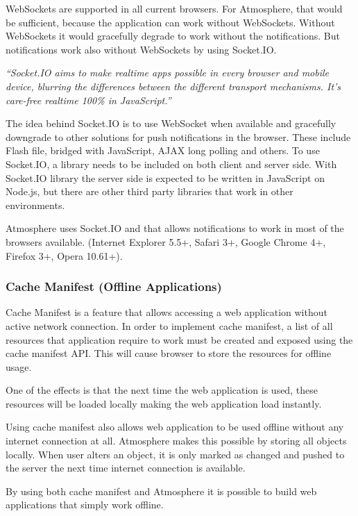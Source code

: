 WebSockets are supported in all current browsers. For Atmosphere, that would be sufficient, because the application can work without WebSockets. Without WebSockets it would gracefully degrade to work without the notifications. But notifications work also without WebSockets by using Socket.IO. \citep{socketio}

\emph{``Socket.IO aims to make realtime apps possible in every browser and mobile device, blurring the differences between the different transport mechanisms. It's care-free realtime 100\% in JavaScript.''} \citep{socketio}

The idea behind Socket.IO is to use WebSocket when available and gracefully downgrade to other solutions for push notifications in the browser. These include Flash file, bridged with JavaScript, AJAX long polling and others. To use Socket.IO, a library needs to be included on both client and server side. With Socket.IO library the server side is expected to be written in JavaScript on Node.js, but there are other third party libraries that work in other environments.

Atmosphere uses Socket.IO and that allows notifications to work in most of the browsers available. (Internet Explorer 5.5+, Safari 3+, Google Chrome 4+, Firefox 3+, Opera 10.61+).

\subsubsection{Cache Manifest (Offline Applications)}

Cache Manifest is a feature that allows accessing a web application without active network connection. In order to implement cache manifest, a list of all resources that application require to work must be created and exposed using the cache manifest API. This will cause browser to store the resources for offline usage.

One of the effects is that the next time the web application is used, these resources will be loaded locally making the web application load instantly.

Using cache manifest also allows web application to be used offline without any internet connection at all. Atmosphere makes this possible by storing all objects locally. When user alters an object, it is only marked as changed and pushed to the server the next time internet connection is available. 

By using both cache manifest and Atmosphere it is possible to build web applications that simply work offline. 

